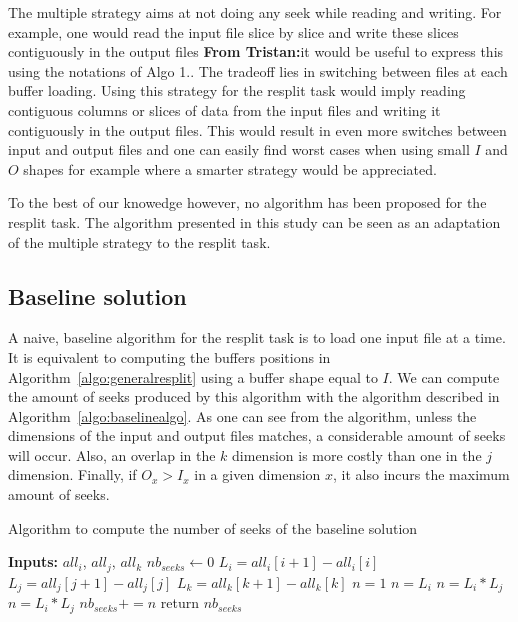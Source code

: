 \documentclass[conference]{IEEEtran}
\newcommand{\tristan}[1]{\color{orange}\textbf{From Tristan:}#1\color{black}}
\begin{document}
The multiple strategy aims at not doing any seek while reading and writing. For
example, one would read the input file slice by slice and write these slices
contiguously in the output files \tristan{it would be useful to express this using the notations of Algo 1.}. The tradeoff lies in switching between files
at each buffer loading. Using this strategy for the resplit task would imply
reading contiguous columns or slices of data from the input files and writing it
contiguously in the output files. This would result in even more switches
between input and output files and one can easily find worst cases when using
small $I$ and $O$ shapes for example where a smarter strategy would be appreciated.

To the best of our knowedge however, no algorithm has been proposed for the
resplit task. The algorithm presented in this study can be seen as an
adaptation of the multiple strategy to the resplit task.

\subsection{Baseline solution}

A naive, baseline algorithm for the resplit task is to load one input file at a
time. It is equivalent to computing the buffers positions in
Algorithm~\ref{algo:generalresplit} using a buffer shape equal to $I$.
We can compute the amount of seeks produced
by this algorithm with the algorithm described in Algorithm~\ref{algo:baselinealgo}.
As one can see from the algorithm, unless the dimensions of the input and output
files matches, a considerable amount of seeks will occur. Also, an overlap in the
$k$ dimension is more costly than one in the $j$ dimension. Finally, if
$O_x>I_x$ in a given dimension $x$, it also incurs the maximum amount of seeks.

\begin{algorithm}
  \caption{Algorithm to compute the number of seeks of the baseline solution}
  \label{algo:baselinealgo}
  \begin{algorithmic}
    \STATE \textbf{Inputs:} $all_i$, $all_j$, $all_k$
    \STATE $nb_{seeks} \leftarrow 0$
          \STATE $L_i = all_i[i+1] - all_i[i]$
          \STATE $L_j = all_j[j+1] - all_j[j]$
          \STATE $L_k = all_k[k+1] - all_k[k]$
                \STATE $n = 1$
              \ELSE
                \STATE $n = L_i$
              \ENDIF
            \ELSE
              \STATE $n = L_i*L_j$
            \ENDIF
          \ELSE
            \STATE $n = L_i*L_j$
          \ENDIF
          \STATE $nb_{seeks} += n$
        \ENDFOR
      \ENDFOR
    \ENDFOR
    \STATE return $nb_{seeks}$
  \end{algorithmic}
\end{algorithm}
\end{document}
